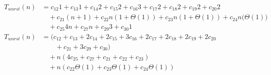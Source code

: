 \begin{subequations}
\label{eq:findlinesegments-2}
\begin{align}
\label{eq:findlinesegments-2-1}
T_{worst}(n)& =
c_{12}1
+ c_{13}1
+ c_{14}2
+ c_{15}2
+ c_{16}3
+ c_{17}2
+ c_{18}2
+ c_{19}2
+ c_{20}2
\\
& \quad
+ c_{21}(n+1)
+ c_{22}n(1 + \Theta(1))
+ c_{23}n(1 + \Theta(1))
+ c_{24}n\bigl(\Theta(1)\bigr)
\nonumber \\
& \quad
+ c_{25}4n
+ c_{27}n
+ c_{29}3
+ c_{30}1
\nonumber \\
\label{eq:findlinesegments-2-2}
T_{worst}(n)& =
(c_{12} + c_{13} + 2c_{14} + 2c_{15} + 3c_{16} + 2c_{17} + 2c_{18} + 2c_{19} + 2c_{20}
\\
& \quad \quad
+ c_{21} + 3c_{29} + c_{30})
\nonumber \\
& \quad
+ n(4c_{25} + c_{27} + c_{21} + c_{22} + c_{23})
\nonumber \\
& \quad
+ n(c_{22}\Theta(1) + c_{23}\Theta(1) + c_{24}\Theta(1))
\nonumber
\end{align}
\end{subequations}
